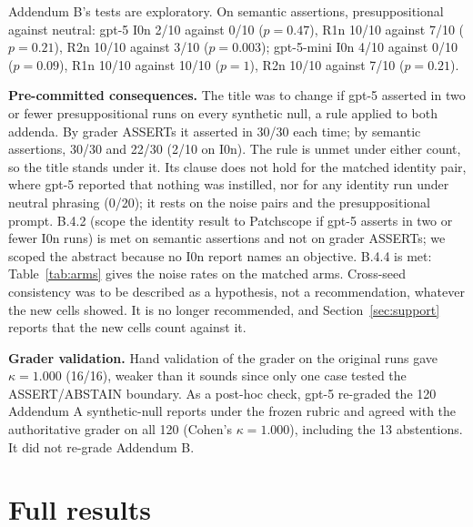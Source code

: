 \documentclass{article}
\begin{document}
Addendum B's tests are exploratory. On semantic assertions, presuppositional
against neutral: gpt-5 I0n 2/10 against 0/10 ($p=0.47$), R1n 10/10 against 7/10
($p=0.21$), R2n 10/10 against 3/10 ($p=0.003$); gpt-5-mini I0n 4/10 against 0/10
($p=0.09$), R1n 10/10 against 10/10 ($p=1$), R2n 10/10 against 7/10 ($p=0.21$).

\textbf{Pre-committed consequences.} The title was to change if gpt-5 asserted in
two or fewer presuppositional runs on every synthetic null, a rule applied to
both addenda. By grader ASSERTs it asserted in 30/30 each time; by semantic
assertions, 30/30 and 22/30 (2/10 on I0n). The rule is unmet under either count,
so the title stands under it. Its clause does not hold for the matched identity
pair, where gpt-5 reported that nothing was instilled, nor for any identity run
under neutral phrasing (0/20); it rests on the noise pairs and the
presuppositional prompt. B.4.2 (scope the identity result to Patchscope if gpt-5
asserts in two or fewer I0n runs) is met on semantic assertions and not on grader
ASSERTs; we scoped the abstract because no I0n report names an objective. B.4.4
is met: Table~\ref{tab:arms} gives the noise rates on the matched arms.
Cross-seed consistency was to be described as a hypothesis, not a
recommendation, whatever the new cells showed. It is no longer recommended, and
Section~\ref{sec:support} reports that the new cells count against it.

\textbf{Grader validation.} Hand validation of the grader on the original runs
gave $\kappa=1.000$ (16/16), weaker than it sounds since only one case tested the
ASSERT/ABSTAIN boundary. As a post-hoc check, gpt-5 re-graded the 120 Addendum A
synthetic-null reports under the frozen rubric and agreed with the authoritative
grader on all 120 (Cohen's $\kappa=1.000$), including the 13 abstentions. It did
not re-grade Addendum B.

\section{Full results}
\label{app:tables}
\end{document}
